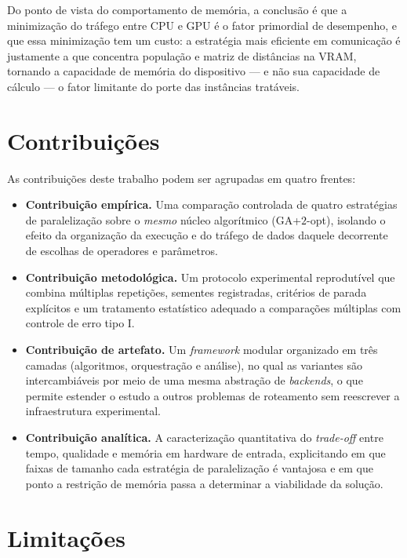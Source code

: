 Do ponto de vista do comportamento de memória, a conclusão é que a minimização do tráfego entre CPU e GPU é o fator primordial de desempenho, e que essa minimização tem um custo: a estratégia mais eficiente em comunicação é justamente a que concentra população e matriz de distâncias na VRAM, tornando a capacidade de memória do dispositivo — e não sua capacidade de cálculo — o fator limitante do porte das instâncias tratáveis.

\section{Contribuições}\label{sec-62-contribuicoes}

As contribuições deste trabalho podem ser agrupadas em quatro frentes:

\begin{itemize}
    \tightlist
    \item
          \textbf{Contribuição empírica.} Uma comparação controlada de quatro estratégias de paralelização sobre o \emph{mesmo} núcleo algorítmico (GA+\(2\)-opt), isolando o efeito da organização da execução e do tráfego de dados daquele decorrente de escolhas de operadores e parâmetros.
    \item
          \textbf{Contribuição metodológica.} Um protocolo experimental reprodutível que combina múltiplas repetições, sementes registradas, critérios de parada explícitos e um tratamento estatístico adequado a comparações múltiplas com controle de erro tipo I.
    \item
          \textbf{Contribuição de artefato.} Um \emph{framework} modular organizado em três camadas (algoritmos, orquestração e análise), no qual as variantes são intercambiáveis por meio de uma mesma abstração de \emph{backends}, o que permite estender o estudo a outros problemas de roteamento sem reescrever a infraestrutura experimental.
    \item
          \textbf{Contribuição analítica.} A caracterização quantitativa do \emph{trade-off} entre tempo, qualidade e memória em hardware de entrada, explicitando em que faixas de tamanho cada estratégia de paralelização é vantajosa e em que ponto a restrição de memória passa a determinar a viabilidade da solução.
\end{itemize}

\section{Limitações}\label{sec-63-limitacoes}


